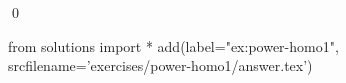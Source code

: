 
\begin{ex} 
  \label{ex:power-homo1}
  
  \qed
\end{ex} 
\begin{python0}
from solutions import *
add(label="ex:power-homo1",
    srcfilename='exercises/power-homo1/answer.tex') 
\end{python0}
